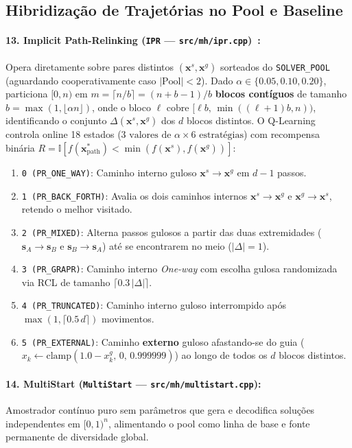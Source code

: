 \documentclass[11pt,a4paper]{article}
\begin{document}
\subsection{Hibridização de Trajetórias no Pool e Baseline}

\paragraph{13. Implicit Path-Relinking (\texttt{IPR} --- \texttt{src/mh/ipr.cpp})~\cite{glover1989tabu}:}
Opera diretamente sobre pares distintos $(\mathbf{x}^s, \mathbf{x}^g)$ sorteados do \texttt{SOLVER\_POOL} (aguardando cooperativamente caso $|\text{Pool}| < 2$). Dado $\alpha \in \{0.05, 0.10, 0.20\}$, particiona $[0, n)$ em $m = \lceil n/b \rceil = (n + b - 1)/b$ \textbf{blocos contíguos} de tamanho $b = \max(1, \lfloor \alpha n \rfloor)$, onde o bloco $\ell$ cobre $[\ell b,\, \min((\ell+1)b, n))$, identificando o conjunto $\Delta(\mathbf{x}^s, \mathbf{x}^g)$ dos $d$ blocos distintos. O Q-Learning controla online 18 estados ($3\text{ valores de }\alpha \times 6\text{ estratégias}$) com recompensa binária $R = \mathbb{I}[f(\mathbf{x}^*_{\text{path}}) < \min(f(\mathbf{x}^s), f(\mathbf{x}^g))]$:
\begin{enumerate}[leftmargin=*, nosep]
  \item \texttt{0 (PR\_ONE\_WAY)}: Caminho interno guloso $\mathbf{x}^s \to \mathbf{x}^g$ em $d-1$ passos.
  \item \texttt{1 (PR\_BACK\_FORTH)}: Avalia os dois caminhos internos $\mathbf{x}^s \to \mathbf{x}^g$ e $\mathbf{x}^g \to \mathbf{x}^s$, retendo o melhor visitado.
  \item \texttt{2 (PR\_MIXED)}: Alterna passos gulosos a partir das duas extremidades ($\mathbf{s}_A \to \mathbf{s}_B$ e $\mathbf{s}_B \to \mathbf{s}_A$) até se encontrarem no meio ($|\Delta| = 1$).
  \item \texttt{3 (PR\_GRAPR)}: Caminho interno \emph{One-way} com escolha gulosa randomizada via RCL de tamanho $\lceil 0.3\,|\Delta| \rceil$.
  \item \texttt{4 (PR\_TRUNCATED)}: Caminho interno guloso interrompido após $\max(1, \lceil 0.5\, d \rceil)$ movimentos.
  \item \texttt{5 (PR\_EXTERNAL)}: Caminho \textbf{externo} guloso afastando-se do guia ($x_k \leftarrow \text{clamp}(1.0 - x^g_k,\, 0,\, 0.999999)$) ao longo de todos os $d$ blocos distintos.
\end{enumerate}

\paragraph{14. MultiStart (\texttt{MultiStart} --- \texttt{src/mh/multistart.cpp}):}
Amostrador contínuo puro sem parâmetros que gera e decodifica soluções independentes em $[0,1)^n$, alimentando o pool como linha de base e fonte permanente de diversidade global.
\end{document}
